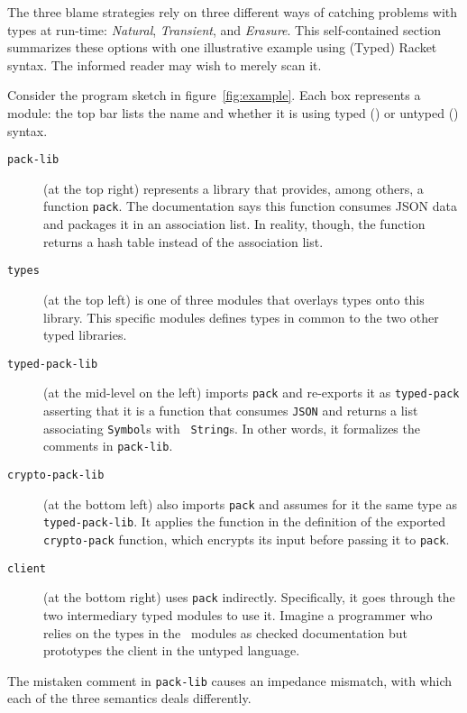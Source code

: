 
The three blame strategies rely on three different ways of catching problems
with types at run-time: {\em Natural\/}, {\em Transient\/}, and {\em
Erasure\/}. This self-contained section summarizes these options with one
illustrative example using (Typed) Racket syntax. The informed reader may wish to merely
scan it.

Consider the program sketch in figure~\ref{fig:example}. Each box represents a
module: the top bar lists the name and whether it is using typed (\typecolor) or
untyped (\dyncolor) syntax.
\begin{description}

\item[\texttt{pack-lib}] (at the top right) represents a library that provides,
among others, a function {\tt pack}. The documentation says this function
consumes JSON data and packages it in an association list. In reality, though, the
function returns a hash table instead of the association list. 

\item[\texttt{types}] (at the top left) is one of three modules that overlays
types onto this library. This specific modules defines types in common to the
two other typed libraries. 

\item[\texttt{typed-pack-lib}] (at the mid-level on the left) imports {\tt pack}
and re-exports it as \texttt{typed-pack} asserting that it is a function that
consumes {\tt JSON} and returns a list associating {\tt Symbol}s with {\tt
String}s. In other words, it formalizes the comments in {\tt pack-lib}.

\item[\texttt{crypto-pack-lib}] (at the bottom left) also imports \texttt{pack}
and assumes for it the same type as {\tt typed-pack-lib}. It applies the
function in the definition of the exported {\tt crypto-pack} function, which
encrypts its input before passing it to \texttt{pack}.

\item[\texttt{client}] (at the bottom right) uses {\tt pack}
indirectly. Specifically, it goes through the two intermediary typed modules to
use it. Imagine a programmer who relies on the types in the \typecolor\
modules as checked documentation but prototypes the client in the untyped language.

\end{description}
The mistaken comment in {\tt pack-lib} causes an impedance mismatch,
with which each of the three semantics deals differently. 

